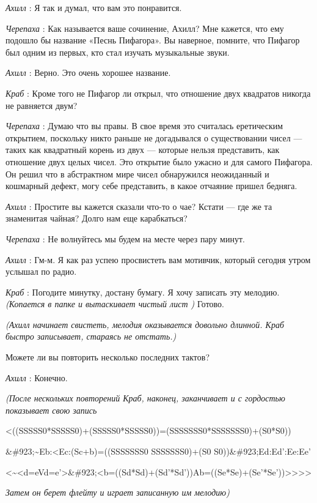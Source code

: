 \emph{Ахилл} : Я так и думал, что вам это понравится.

\emph{Черепаха} : Как называется ваше сочинение, Ахилл? Мне кажется, что ему подошло бы название «Песнь Пифагора». Вы наверное, помните, что Пифагор был одним из первых, кто стал изучать музыкальные звуки.

\emph{Ахилл} : Верно. Это очень хорошее название.

\emph{Краб} : Кроме того не Пифагор ли открыл, что отношение двух квадратов никогда не равняется двум?

\emph{Черепаха} : Думаю что вы правы. В свое время это считалась еретическим открытием, поскольку никто раньше не догадывался о существовании чисел --- таких как квадратный корень из двух --- которые нельзя представить, как отношение двух целых чисел. Это открытие было ужасно и для самого Пифагора. Он решил что в абстрактном мире чисел обнаружился неожиданный и кошмарный дефект, могу себе представить, в какое отчаяние пришел бедняга.

\emph{Ахилл} : Простите вы кажется сказали что-то о чае? Кстати --- где же та знаменитая чайная? Долго нам еще карабкаться?

\emph{Черепаха} : Не волнуйтесь мы будем на месте через пару минут.

\emph{Ахилл} : Гм-м. Я как раз успею просвистеть вам мотивчик, который сегодня утром услышал по радио.

\emph{Краб} : Погодите минутку, достану бумагу. Я хочу записать эту мелодию. \emph{(Копается в папке и вытаскивает чистый лист )} Готово.

\emph{(Ахилл начинает свистеть, мелодия оказывается довольно длинной. Краб быстро записывает, стараясь не отстать.)}

Можете ли вы повторить несколько последних тактов?

\emph{Ахилл} : Конечно.

\emph{(После нескольких повторений Краб, наконец, заканчивает и с гордостью показывает свою запись}

\textless((SSSSS0*SSSSS0)+(SSSSS0*SSSSS0))=(SSSSSSS0*SSSSSSS0)+(S0*S0))

\&\#923;\textasciitilde Eb:\textless Ec:(Sc+b)=((SSSSSSS0 SSSSSSS0)+(S0 S0))\&\#923;Ed:Ed':Ee:Ee'

\textless\textasciitilde\textless d=eVd=e'\textgreater\&\#923;\textless b=((Sd*Sd)+(Sd'*Sd'))Ab=((Se*Se)+(Se'*Se'))\textgreater\textgreater\textgreater\textgreater{}

\emph{Затем он берет флейту и играет записанную им мелодию)}

